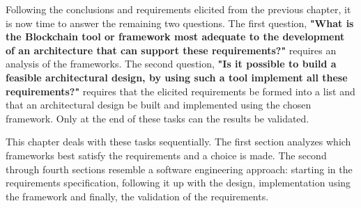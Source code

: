 

Following the conclusions and requirements elicited from the previous chapter, it is now time to answer the remaining two questions. The first question, \textbf{"What is the Blockchain tool or framework most adequate to the development of an architecture that can support these requirements?"} requires an analysis of the frameworks. The second question, \textbf{"Is it possible to build a feasible architectural design, by using such a tool implement all these requirements?"} requires that the elicited requirements be formed into a list and that an architectural design be built and implemented using the chosen framework. Only at the end of these tasks can the results be validated. 

This chapter deals with these tasks sequentially. The first section analyzes which frameworks best satisfy the requirements and a choice is made. The second through fourth sections resemble a software engineering approach: starting in the requirements specification, following it up with the design, implementation using the framework and finally, the validation of the requirements.